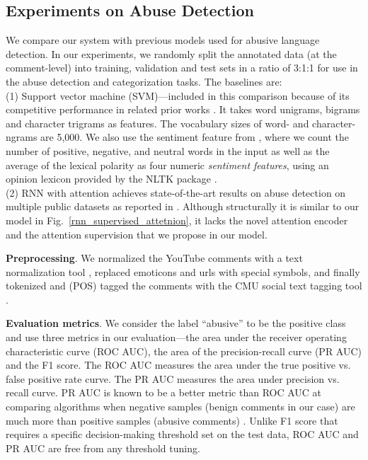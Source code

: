 \documentclass[letterpaper]{article} %
\begin{document}
\subsection{Experiments on Abuse Detection}

We compare our system with previous models used for abusive language detection.
In our experiments, we randomly split the annotated data (at the comment-level) into training, validation and test sets in a ratio of 3:1:1 for use in the  abuse detection and categorization tasks.
The baselines are: \\
\noindent(1) Support vector machine (SVM)---included in this comparison because of its competitive performance in related prior works \cite{van2015detection,nobata2016abusive}. It takes word unigrams, bigrams and character trigrams as features. The vocabulary sizes of word- and character- ngrams are 5,000.
We also use the sentiment feature from \cite{van2015detection}, where we count the number of positive, negative, and neutral words in the input as well as the average of the lexical polarity as four numeric \textit{sentiment features}, using an opinion lexicon  provided by the NLTK package  \cite{opinionlexicon}. \\
\noindent(2) RNN with attention achieves state-of-the-art results on abuse detection on multiple public datasets as reported in \cite{chakrabarty2019pay}. Although structurally it is similar to our model in Fig.~\ref{rnn_supervised_attetnion}, it lacks the novel attention encoder and the  attention supervision that we propose in our model.


\noindent\textbf{Preprocessing}.
We normalized the YouTube comments with a text normalization tool \cite{tweet_preprocessor}, replaced  emoticons and urls  with special symbols, and  finally tokenized and (POS) tagged the comments with the CMU social text tagging tool \cite{owoputi2013improved}.



\noindent\textbf{Evaluation metrics}.
We consider the label ``abusive'' to be the positive class and use three metrics in our evaluation---the area under the receiver operating characteristic curve (ROC AUC), the area of the precision-recall curve (PR AUC) and the F1 score.
The ROC AUC measures the area under the true positive vs. false positive rate curve. The PR AUC measures the area under precision vs. recall curve.
PR AUC is known to be a better metric than ROC AUC at comparing algorithms when  negative samples (benign comments in our case) are much more than positive samples (abusive comments) \cite{davis2006relationship}. Unlike F1 score that requires a specific decision-making threshold set on the test data,  ROC AUC and PR AUC are free from any threshold tuning.
\end{document}
